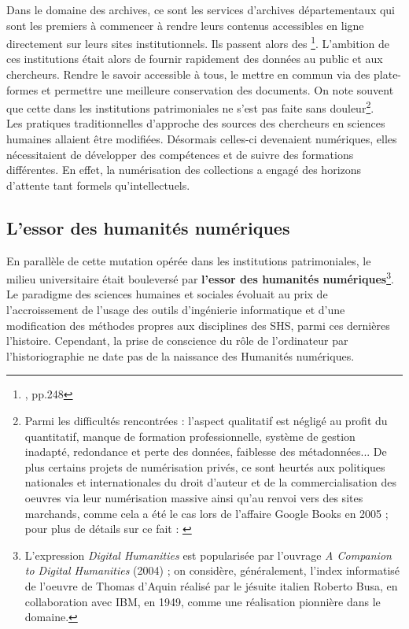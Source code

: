 Dans le domaine des archives, ce sont les services d'archives départementaux qui sont les premiers à commencer à rendre leurs contenus accessibles en ligne directement sur leurs sites institutionnels. Ils passent alors des \footnote{\cite{limon-bonnet_innovation_2019}, pp.248}. L'ambition de ces institutions était alors de fournir rapidement des données au public et aux chercheurs. Rendre le savoir accessible à tous, le mettre en commun via des plate-formes et permettre une meilleure conservation des documents.
On note souvent que cette  dans les institutions patrimoniales ne s'est pas faite sans douleur\footnote{Parmi les difficultés rencontrées : l'aspect qualitatif est négligé au profit du quantitatif, manque de formation professionnelle, système de gestion inadapté, redondance et perte des données, faiblesse des métadonnées... De plus certains projets de numérisation privés, ce sont heurtés aux politiques nationales et internationales du droit d'auteur et de la commercialisation des oeuvres via leur numérisation massive ainsi qu'au renvoi vers des sites marchands, comme cela a été le cas lors de l'affaire Google Books en 2005 ; pour plus de détails sur ce fait : \cite{jeanneney_quand_2010}}.\\Les pratiques traditionnelles d'approche des sources des chercheurs en sciences humaines allaient être modifiées. Désormais celles-ci devenaient numériques, elles nécessitaient de développer des compétences et de suivre des formations différentes. En effet, la numérisation des collections a engagé des horizons d'attente tant formels qu'intellectuels.

\subsection{L'essor des humanités numériques}\label{essor_humanités_num}

En parallèle de cette mutation opérée dans les institutions patrimoniales, le milieu universitaire était bouleversé par \textbf{l'essor des humanités numériques}\footnote{L'expression \textit{Digital Humanities} est popularisée par l'ouvrage \textit{A Companion to Digital Humanities} (2004) ; on considère, généralement, l'index informatisé de l'oeuvre de Thomas d'Aquin réalisé par le jésuite italien Roberto Busa, en collaboration avec IBM, en 1949, comme une réalisation pionnière dans le domaine.}. Le paradigme des sciences humaines et sociales évoluait au prix de l'accroissement de  l'usage des outils d'ingénierie informatique et d'une modification des méthodes propres aux disciplines des SHS, parmi ces dernières l'histoire. Cependant, la prise de conscience du rôle de l'ordinateur par l'historiographie ne date pas de la naissance des Humanités numériques.\\ 

